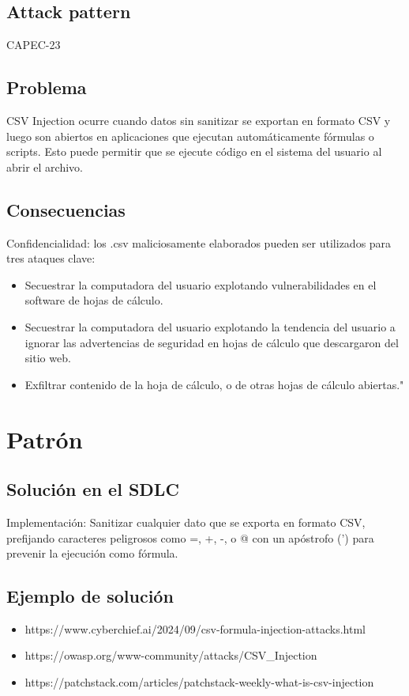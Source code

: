 \subsection*{Attack pattern}
CAPEC-23
\subsection*{Problema}
CSV Injection ocurre cuando datos sin sanitizar se exportan en formato CSV y luego son abiertos en aplicaciones que ejecutan automáticamente fórmulas o scripts. Esto puede permitir que se ejecute código en el sistema del usuario al abrir el archivo.
\subsection*{Consecuencias}
Confidencialidad: los .csv maliciosamente elaborados pueden ser utilizados para tres ataques clave:
\begin{itemize}
    \item Secuestrar la computadora del usuario explotando vulnerabilidades en el software de hojas de cálculo.
    \item Secuestrar la computadora del usuario explotando la tendencia del usuario a ignorar las advertencias de seguridad en hojas de cálculo que descargaron del sitio web.
    \item Exfiltrar contenido de la hoja de cálculo, o de otras hojas de cálculo abiertas."
\end{itemize}


\section{Patrón}
\subsection*{Solución en el SDLC}
Implementación: Sanitizar cualquier dato que se exporta en formato CSV, prefijando caracteres peligrosos como =, +, -, o @ con un apóstrofo (') para prevenir la ejecución como fórmula.
\subsection*{Ejemplo de solución}
\begin{itemize}
    \item https://www.cyberchief.ai/2024/09/csv-formula-injection-attacks.html
    \item https://owasp.org/www-community/attacks/CSV\_Injection
    \item https://patchstack.com/articles/patchstack-weekly-what-is-csv-injection
\end{itemize}
